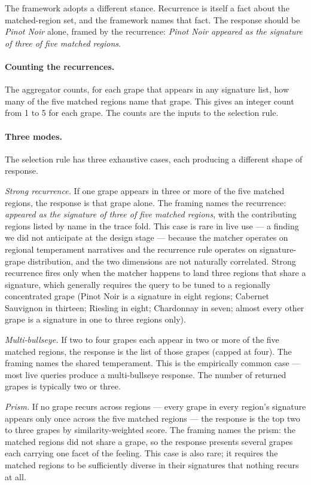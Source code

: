 \documentclass[11pt]{article}
\begin{document}
The framework adopts a different stance. Recurrence is itself a fact about the matched-region set, and the framework names that fact. The response should be \emph{Pinot Noir} alone, framed by the recurrence: \emph{Pinot Noir appeared as the signature of three of five matched regions}.

\paragraph{Counting the recurrences.}
The aggregator counts, for each grape that appears in any signature list, how many of the five matched regions name that grape. This gives an integer count from 1 to 5 for each grape. The counts are the inputs to the selection rule.

\paragraph{Three modes.}
The selection rule has three exhaustive cases, each producing a different shape of response.

\emph{Strong recurrence.} If one grape appears in three or more of the five matched regions, the response is that grape alone. The framing names the recurrence: \emph{appeared as the signature of three of five matched regions}, with the contributing regions listed by name in the trace fold. This case is rare in live use --- a finding we did not anticipate at the design stage --- because the matcher operates on regional temperament narratives and the recurrence rule operates on signature-grape distribution, and the two dimensions are not naturally correlated. Strong recurrence fires only when the matcher happens to land three regions that share a signature, which generally requires the query to be tuned to a regionally concentrated grape (Pinot Noir is a signature in eight regions; Cabernet Sauvignon in thirteen; Riesling in eight; Chardonnay in seven; almost every other grape is a signature in one to three regions only).

\emph{Multi-bullseye.} If two to four grapes each appear in two or more of the five matched regions, the response is the list of those grapes (capped at four). The framing names the shared temperament. This is the empirically common case --- most live queries produce a multi-bullseye response. The number of returned grapes is typically two or three.

\emph{Prism.} If no grape recurs across regions --- every grape in every region's signature appears only once across the five matched regions --- the response is the top two to three grapes by similarity-weighted score. The framing names the prism: the matched regions did not share a grape, so the response presents several grapes each carrying one facet of the feeling. This case is also rare; it requires the matched regions to be sufficiently diverse in their signatures that nothing recurs at all.
\end{document}
